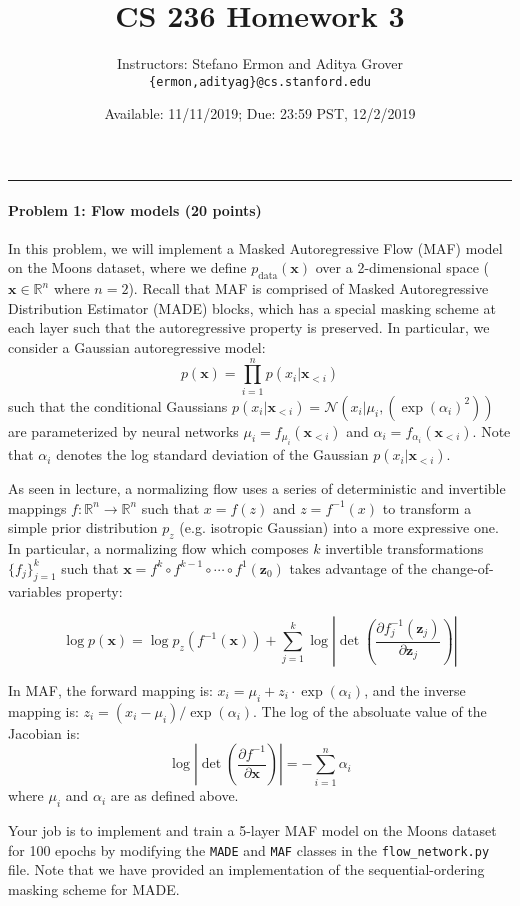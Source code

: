 \documentclass{article}
\title{CS 236 Homework 3}
\author{Instructors: Stefano Ermon and Aditya Grover \\ \texttt{\{ermon,adityag\}@cs.stanford.edu}}
\date{Available: 11/11/2019; Due: 23:59 PST, 12/2/2019}
\newcommand{\bx}{{\boldsymbol{x}}}
\newcommand{\bz}{{\boldsymbol{z}}}
\newcommand{\abs}[1]{\left| #1\right|}
\begin{document}
\maketitle

\rule{\linewidth}{0.4pt}
\paragraph{Problem 1: Flow models (20 points) \\}

In this problem, we will implement a Masked Autoregressive Flow (MAF) model on the Moons dataset, where we define $p_{\text{data}}(\bx)$ over a 2-dimensional space ($\bx \in \mathbb{R}^n$ where $n=2$). Recall that MAF is comprised of Masked Autoregressive Distribution Estimator (MADE) blocks, which has a special masking scheme at each layer such that the autoregressive property is preserved. In particular, we consider a Gaussian autoregressive model:
$$p(\bx) = \prod_{i=1}^n p(x_i \vert \bx_{<i})$$
such that the conditional Gaussians $p(x_i \vert \bx_{<i}) = \mathcal{N}(x_i|\mu_i, (\exp(\alpha_i)^2))$ are parameterized by neural networks $\mu_i = f_{\mu_i}(\bx_{<i})$ and $\alpha_i = f_{\alpha_i}(\bx_{<i})$. Note that $\alpha_i$ denotes the log standard deviation of the Gaussian $p(x_i \vert \bx_{<i})$.

As seen in lecture, a normalizing flow uses a series of deterministic and invertible mappings $f:\mathbb{R}^n \rightarrow \mathbb{R}^n$ such that $x = f(z)$ and $z = f^{-1}(x)$ to transform a simple prior distribution $p_z$ (e.g. isotropic Gaussian) into a more expressive one. In particular, a normalizing flow which composes
$k$ invertible transformations $\{f_j \}_{j=1}^k$ such that $\bx = f^k \circ f^{k-1}\circ \cdots \circ f^1(\bz_0) $ 
takes advantage of the change-of-variables property:

$$\log p(\bx) = \log p_z(f^{-1}(\bx)) + \sum_{j=1}^k \log \abs{\det \left( \frac{\partial f_j^{-1}(\bz_j)}{\partial \bz_{j}} \right)}$$

In MAF, the forward mapping is: $x_i = \mu_i + z_i \cdot \exp(\alpha_i)$, and the inverse mapping is: $z_i = (x_i - \mu_i)/\exp(\alpha_i)$. The log of the absoluate value of the Jacobian is:
$$\log \abs{\det \left( \frac{\partial f^{-1}}{\partial \bx} \right)} = - \sum_{i=1}^n \alpha_i$$
where $\mu_i$ and $\alpha_i$ are as defined above. 

Your job is to implement and train a 5-layer MAF model on the Moons dataset for 100 epochs by modifying the \texttt{MADE} and \texttt{MAF} classes in the \texttt{flow\_network.py} file. Note that we have provided an implementation of the sequential-ordering masking scheme for MADE.
\end{document}

